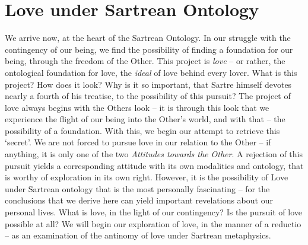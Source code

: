 \chapter{Love under Sartrean Ontology}
\label{chap:love}




We arrive now, at the heart of the Sartrean Ontology. In our struggle with the contingency of our being, we find the possibility of finding a foundation for our being, through the freedom of the Other. This project is \emph{love} -- or rather, the ontological foundation for love, the \emph{ideal} of love behind every lover. What is this project? How does it look? Why is it so important, that Sartre himself devotes nearly a fourth of his treatise, to the possibility of this pursuit? The project of love always begins with the Others look -- it is through this look that we experience the flight of our being into the Other's world, and with that -- the possibility of a foundation.  With this, we begin our attempt to retrieve this \enquote*{secret}.  We are not forced to pursue love in our relation to the Other -- if anything, it is only one of the two \emph{Attitudes towards the Other}. A rejection of this pursuit yields a corresponding attitude
with its own modalities and ontology, that is worthy of exploration in its own right. However, it is the possibility of Love under Sartrean ontology that is the most personally fascinating -- for the conclusions that we derive here can yield important revelations about our personal lives. What is love, in the light of our contingency? Is the pursuit of love possible at all? We will begin our exploration of love, in the manner of a reductio -- as an examination of the antinomy of love under Sartrean metaphysics.

